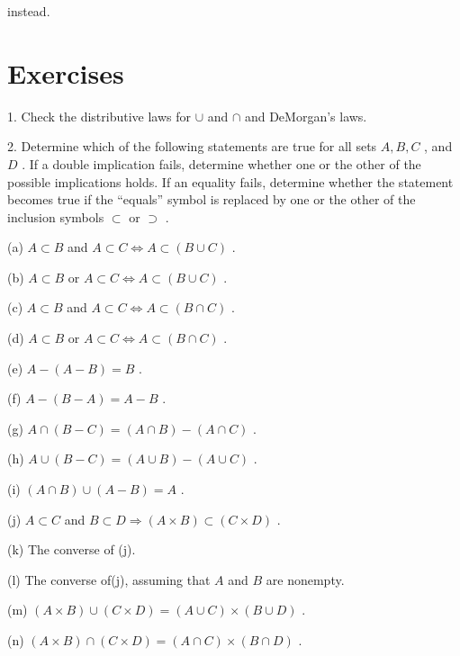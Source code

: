 instead.

\section*{Exercises}

1. Check the distributive laws for \(\cup\) and \(\cap\) and DeMorgan’s laws.

2. Determine which of the following statements are true for all sets \(A,B,C\) , and \(D\) . If a double implication fails, determine whether one or the other of the possible implications holds. If an equality fails, determine whether the statement becomes true if the ``equals'' symbol is replaced by one or the other of the inclusion symbols \(\subset\) or \(\supset\) .

(a) \(A \subset  B\) and \(A \subset  C \Leftrightarrow  A \subset  \left( {B \cup  C}\right)\) .

(b) \(A \subset  B\) or \(A \subset  C \Leftrightarrow  A \subset  \left( {B \cup  C}\right)\) .

(c) \(A \subset  B\) and \(A \subset  C \Leftrightarrow  A \subset  \left( {B \cap  C}\right)\) .

(d) \(A \subset  B\) or \(A \subset  C \Leftrightarrow  A \subset  \left( {B \cap  C}\right)\) .

(e) \(A - \left( {A - B}\right)  = B\) .

(f) \(A - \left( {B - A}\right)  = A - B\) .

(g) \(A \cap  \left( {B - C}\right)  = \left( {A \cap  B}\right)  - \left( {A \cap  C}\right)\) .

(h) \(A \cup  \left( {B - C}\right)  = \left( {A \cup  B}\right)  - \left( {A \cup  C}\right)\) .

(i) \(\left( {A \cap  B}\right)  \cup  \left( {A - B}\right)  = A\) .

(j) \(A \subset  C\) and \(B \subset  D \Rightarrow  \left( {A \times  B}\right)  \subset  \left( {C \times  D}\right)\) .

(k) The converse of (j).

(l) The converse of(j), assuming that \(A\) and \(B\) are nonempty.

(m) \(\left( {A \times  B}\right)  \cup  \left( {C \times  D}\right)  = \left( {A \cup  C}\right)  \times  \left( {B \cup  D}\right)\) .

(n) \(\left( {A \times  B}\right)  \cap  \left( {C \times  D}\right)  = \left( {A \cap  C}\right)  \times  \left( {B \cap  D}\right)\) .


